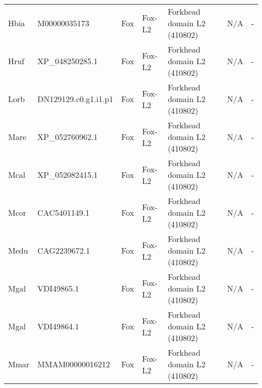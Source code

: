\documentclass[../main.tex]{subfiles}
\begin{document}
\begin{landscape}
\begin{longtable}{lllllll}
		Hbia           & M00000035173          & Fox            & Fox-L2              & Forkhead domain L2 (410802)                 & N/A                                                                    & -                    \\
		Hruf           & XP\_048250285.1       & Fox            & Fox-L2              & Forkhead domain L2 (410802)                 & N/A                                                                    & -                    \\
		Lorb           & DN129129.c0.g1.i1.p1  & Fox            & Fox-L2              & Forkhead domain L2 (410802)                 & N/A                                                                    & -                    \\
		Mare           & XP\_052760962.1       & Fox            & Fox-L2              & Forkhead domain L2 (410802)                 & N/A                                                                    & -                    \\
		Mcal           & XP\_052082415.1       & Fox            & Fox-L2              & Forkhead domain L2 (410802)                 & N/A                                                                    & -                    \\
		Mcor           & CAC5401149.1          & Fox            & Fox-L2              & Forkhead domain L2 (410802)                 & N/A                                                                    & -                    \\
		Medu           & CAG2239672.1          & Fox            & Fox-L2              & Forkhead domain L2 (410802)                 & N/A                                                                    & -                    \\
		Mgal           & VDI49865.1            & Fox            & Fox-L2              & Forkhead domain L2 (410802)                 & N/A                                                                    & -                    \\
		Mgal           & VDI49864.1            & Fox            & Fox-L2              & Forkhead domain L2 (410802)                 & N/A                                                                    & -                    \\
		Mmar           & MMAM00000016212       & Fox            & Fox-L2              & Forkhead domain L2 (410802)                 & N/A                                                                    & -                    \\

\end{longtable}
\end{landscape}
\end{document}
